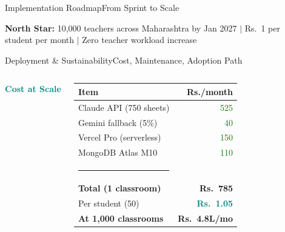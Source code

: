 \begin{frame}[t]{Implementation Roadmap}{From Sprint to Scale}
\begin{center}
\begin{tikzpicture}
\end{tikzpicture}
\end{center}
\vspace{6pt}
\begin{center}
\colorbox{card}{\parbox{0.88\textwidth}{\centering\vspace{3pt}
  \textcolor{orng}{\small\textbf{North Star:}}\;
  \textcolor{txt}{\small 10,000 teachers across Maharashtra by Jan 2027 \;$|$\;
  Rs.\ 1 per student per month \;$|$\; Zero teacher workload increase}
\vspace{3pt}}}
\end{center}
\end{frame}

\begin{frame}[t,shrink=5]{Deployment \& Sustainability}{Cost, Maintenance, Adoption Path}
\begin{columns}[T]

\vspace{4pt}
\textcolor{teal}{\small\textbf{Cost at Scale}}\\[5pt]
\renewcommand{\arraystretch}{1.5}
\colorbox{card}{\parbox{0.92\linewidth}{%
\vspace{3pt}
\begin{tabular}{@{\,}p{3.8cm}r@{\,}}
  \textcolor{txtsec}{\scriptsize\bfseries Item} & \textcolor{orng}{\scriptsize\bfseries Rs./month}\\
  \midrule
  \textcolor{txt}{\scriptsize Claude API (750 sheets)} & \textcolor{green}{\scriptsize 525}\\
  \textcolor{txt}{\scriptsize Gemini fallback (5\%)}   & \textcolor{green}{\scriptsize 40}\\
  \textcolor{txt}{\scriptsize Vercel Pro (serverless)}  & \textcolor{green}{\scriptsize 150}\\
  \textcolor{txt}{\scriptsize MongoDB Atlas M10}        & \textcolor{green}{\scriptsize 110}\\
  \textcolor{cardbdr}{\scriptsize\rule{3.8cm}{0.3pt}} & \\
  \textcolor{txt}{\scriptsize\bfseries Total (1 classroom)} & \textcolor{orng}{\scriptsize\bfseries Rs.\ 785}\\
  \textcolor{txt}{\scriptsize Per student (50)}         & \textcolor{teal}{\scriptsize\bfseries Rs.\ 1.05}\\
  \textcolor{txt}{\scriptsize\bfseries At 1,000 classrooms} & \textcolor{orng}{\scriptsize\bfseries Rs.\ 4.8L/mo}\\
\end{tabular}
\vspace{3pt}}}


\end{columns}
\end{frame}
